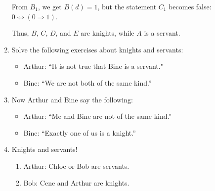 \documentclass[11pt,paper=b5,footinclude,headinclude]{scrbook} %
\theoremstyle{remark}
\theoremstyle{definition} %
\theoremstyle{theorem} %
\begin{document}
\begin{enumerate}[Problem 1.]
From \( B_1 \), we get \( B(d) = 1 \), but the statement \( C_1 \) becomes false: \( 0 \iff (0 \Rightarrow 1) \).

Thus, \( B \), \( C \), \( D \), and \( E \) are knights, while \( A \) is a servant.



\item Solve the following exercises about knights and servants:
\begin{itemize}
  \item Arthur: ``It is not true that Bine is a servant."
  \item Bine: ``We are not both of the same kind.''
\end{itemize}




\item 
Now Arthur and Bine say the following:
\begin{itemize}
 \item Arthur: ``Me and Bine are not of the same kind.''
 \item Bine: ``Exactly one of us is a knight.''
\end{itemize}


\item Knights and servants! 
\begin{enumerate}

\item Arthur: Chloe or Bob are servants.
\item 
Bob: Cene and Arthur are knights.
\end{enumerate}




\end{enumerate}
\end{document}
